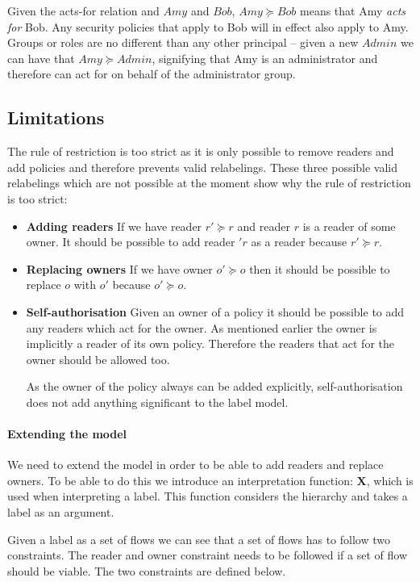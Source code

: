 Given the acts-for relation and \principals{} $Amy$ and $Bob$, $Amy \succeq Bob$ means that Amy \textit{acts for} Bob.
Any security policies that apply to Bob will in effect also apply to Amy.
Groups or roles are no different than any other principal -- given a new \principal{} $Admin$ we can have that $Amy \succeq Admin$, signifying that Amy is an administrator and therefore can act for on behalf of the administrator group.

\subsection{Limitations}
The rule of restriction is too strict as it is only possible to remove readers and add policies and therefore prevents valid relabelings.
These three possible valid relabelings which are not possible at the moment show why the rule of restriction is too strict:

\begin{itemize}
\item \textbf{Adding readers}
If we have reader $r' \succeq r$ and reader $r$ is a reader of some owner.
It should be possible to add reader $'r$ as a reader because $r' \succeq r$.

\item \textbf{Replacing owners}
If we have owner $o' \succeq o$ then it should be possible to replace $o$ with $o'$ because $o' \succeq o$.

\item \textbf{Self-authorisation}
Given an owner of a policy it should be possible to add any readers which act for the owner.
As mentioned earlier the owner is implicitly a reader of its own policy.
Therefore the readers that act for the owner should be allowed too.

As the owner of the policy always can be added explicitly, self-authorisation does not add anything significant to the label model.
\end{itemize}


\paragraph{Extending the model}
We need to extend the model in order to be able to add readers and replace owners.
To be able to do this we introduce an interpretation function: $\textbf{X}$, which is used when interpreting a label.
This function considers the \principal{} hierarchy and takes a label as an argument.

Given a label as a set of flows we can see that a set of flows has to follow two constraints.
The reader and owner constraint needs to be followed if a set of flow should be viable.
The two constraints are defined below.

